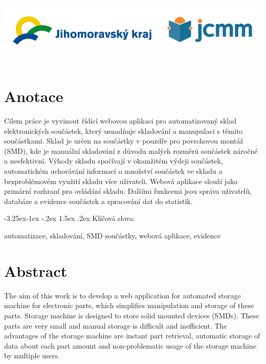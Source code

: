 \documentclass[12pt, a4paper, oneside]{article}
\makeatletter
\renewcommand\paragraph{\@startsection{paragraph}{4}{\z@}%
      {-3.25ex\@plus -1ex \@minus -.2ex}%
      {1.5ex \@plus .2ex}%
      {\normalfont\normalsize\bfseries}}
\makeatother
\begin{document}
\hfill\\[\intextsep]
\begin{minipage}{\textwidth}
\begin{center}
\includegraphics[scale=0.28]{img/loga_podekovani.png}
\end{center}
\end{minipage}
\vspace{2mm}
\normalsize

\newpage   %
~ %
\vspace{5mm}

\section*{Anotace}

Cílem práce je vyvinout řídicí webovou aplikaci pro automatizovaný sklad elektronických součástek, který usnadňuje skladování a manupulaci s těmito součástkami. Sklad je určen na součástky v pouzdře pro povrchovou montáž (SMD), kde je manuální skladování z důvodu malých rozměrů součástek náročné a neefektivní. Výhody skladu spočívají v okamžitém výdeji součástek, automatickém uchovávání informací o množství součástek ve skladu a bezproblémovém využití skladu více uživateli.
Webová aplikace slouží jako primární rozhraní pro ovládání skladu. Dalšími funkcemi jsou správa uživatelů, databáze a evidence součástek a zpracování dat do statistik.


\paragraph{Klíčová slova:}

automatizace, skladování, SMD součástky, webová aplikace, evidence

\vspace{18mm}

\section*{Abstract}

The aim of this work is to develop a web application for automated storage machine for electronic parts, which simplifies manipulation and storage of these parts. Storage machine is designed to store solid mounted devices (SMDs). These parts are very small and manual storage is difficult and inefficient. The advantages of the storage machine are instant part retrieval, automatic storage of data about each part amount and non-problematic usage of the storage machine by multiple users.
\end{document}
